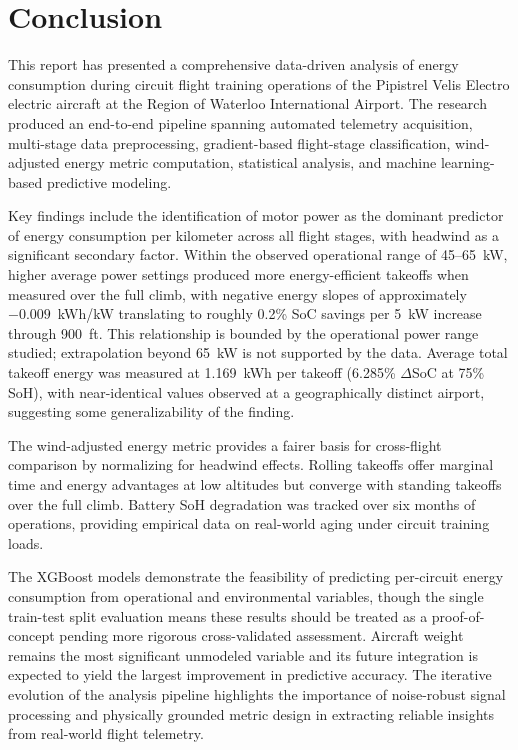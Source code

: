 \documentclass[11pt,a4paper]{article}
\begin{document}
\section{Conclusion}

This report has presented a comprehensive data-driven analysis of energy consumption during circuit flight training operations of the Pipistrel Velis Electro electric aircraft at the Region of Waterloo International Airport.
The research produced an end-to-end pipeline spanning automated telemetry acquisition, multi-stage data preprocessing, gradient-based flight-stage classification, wind-adjusted energy metric computation, statistical analysis, and machine learning-based predictive modeling.

Key findings include the identification of motor power as the dominant predictor of energy consumption per kilometer across all flight stages, with headwind as a significant secondary factor.
Within the observed operational range of 45--65~kW, higher average power settings produced more energy-efficient takeoffs when measured over the full climb, with negative energy slopes of approximately $-0.009$~kWh/kW translating to roughly 0.2\% SoC savings per 5~kW increase through 900~ft.
This relationship is bounded by the operational power range studied; extrapolation beyond 65~kW is not supported by the data.
Average total takeoff energy was measured at 1.169~kWh per takeoff (6.285\% $\Delta$SoC at 75\% SoH), with near-identical values observed at a geographically distinct airport, suggesting some generalizability of the finding.

The wind-adjusted energy metric provides a fairer basis for cross-flight comparison by normalizing for headwind effects.
Rolling takeoffs offer marginal time and energy advantages at low altitudes but converge with standing takeoffs over the full climb.
Battery SoH degradation was tracked over six months of operations, providing empirical data on real-world aging under circuit training loads.

The XGBoost models demonstrate the feasibility of predicting per-circuit energy consumption from operational and environmental variables, though the single train-test split evaluation means these results should be treated as a proof-of-concept pending more rigorous cross-validated assessment.
Aircraft weight remains the most significant unmodeled variable and its future integration is expected to yield the largest improvement in predictive accuracy.
The iterative evolution of the analysis pipeline highlights the importance of noise-robust signal processing and physically grounded metric design in extracting reliable insights from real-world flight telemetry.
\end{document}
